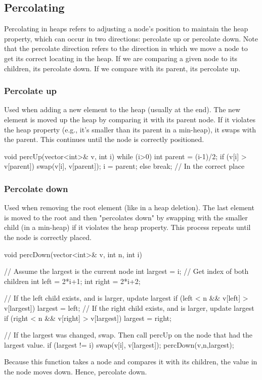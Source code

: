 \documentclass{report}
\begin{document}
\pagebreak 
\subsection{Percolating}
\bigbreak \noindent 
Percolating in heaps refers to adjusting a node’s position to maintain the heap property, which can occur in two directions: percolate up or percolate down.
\bigbreak \noindent 
Note that the percolate direction refers to the direction in which we move a node to get its correct locating in the heap.
\bigbreak \noindent 
If we are comparing a given node to its children, its percolate down. If we compare with its parent, its percolate up.

\bigbreak \noindent 
\subsubsection{Percolate up}
\bigbreak \noindent 
Used when adding a new element to the heap (usually at the end). The new element is moved up the heap by comparing it with its parent node. If it violates the heap property (e.g., it’s smaller than its parent in a min-heap), it swaps with the parent. This continues until the node is correctly positioned.
\bigbreak \noindent 
\begin{cppcode}
void percUp(vector<int>& v, int i) {
    while (i>0) {
        int parent = (i-1)/2;
        if (v[i] > v[parent]) {
            swap(v[i], v[parent]);
            i = parent;
        } else break; // In the correct place
    }
}
\end{cppcode}


\pagebreak \bigbreak \noindent 
\subsubsection{Percolate down}
\bigbreak \noindent 
Used when removing the root element (like in a heap deletion). The last element is moved to the root and then "percolates down" by swapping with the smaller child (in a min-heap) if it violates the heap property. This process repeats until the node is correctly placed.
\bigbreak \noindent 
\begin{cppcode}
    void percDown(vector<int>& v, int n, int i) {
        // Assume the largest is the current node
        int largest = i;
        // Get index of both children
        int left = 2*i+1;
        int right = 2*i+2;

        // If the left child exists, and is larger, update largest
        if (left < n && v[left] > v[largest]) {
            largest = left;
        }
        // If the right child exists, and is larger, update largest
        if (right < n && v[right] > v[largest]) {
            largest = right;
        }

        // If the largest was changed, swap. Then call percUp on the node that had the largest value.
        if (largest != i) {
            swap(v[i], v[largest]);
            percDown(v,n,largest);
        }
    }
\end{cppcode}
\bigbreak \noindent 
Because this function takes a node and compares it with its children, the value in the node moves down. Hence, percolate down.
\end{document}
